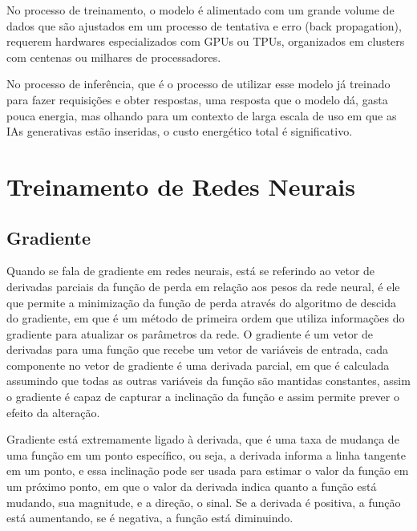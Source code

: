No processo de treinamento, o modelo é alimentado com um grande volume de dados que são ajustados em um processo de tentativa e erro (back propagation), requerem hardwares especializados com GPUs ou TPUs, organizados em clusters com centenas ou milhares de processadores.

No processo de inferência, que é o processo de utilizar esse modelo já treinado para fazer requisições e obter respostas, uma resposta que o modelo dá, gasta pouca energia, mas olhando para um contexto de larga escala de uso em que as IAs generativas estão inseridas, o custo energético total é significativo.

\section{Treinamento de Redes Neurais}

\subsection{Gradiente}
Quando se fala de gradiente em redes neurais, está se referindo ao vetor de derivadas parciais da função de perda em relação aos pesos da rede neural, é ele que permite a minimização da função de perda através do algoritmo de descida do gradiente, em que é um método de primeira ordem que utiliza informações do gradiente para atualizar os parâmetros da rede.
O gradiente é um vetor de derivadas para uma função que recebe um vetor de variáveis de entrada, cada componente no vetor de gradiente é uma derivada parcial, em que é calculada assumindo que todas as outras variáveis da função são mantidas constantes, assim o gradiente é capaz de capturar a inclinação da função e assim permite prever o efeito da alteração.

Gradiente está extremamente ligado à derivada, que é uma taxa de mudança de uma função em um ponto específico, ou seja, a derivada informa a linha tangente em um ponto, e essa inclinação pode ser usada para estimar o valor da função em um próximo ponto, em que o valor da derivada indica quanto a função está mudando, sua magnitude, e a direção, o sinal. Se a derivada é positiva, a função está aumentando, se é negativa, a função está diminuindo.

